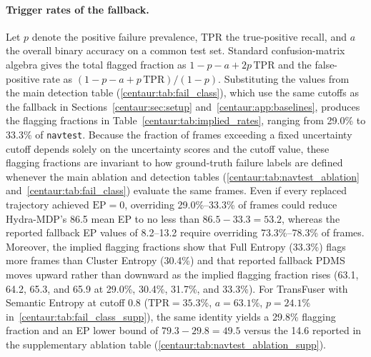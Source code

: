 \paragraph{Trigger rates of the fallback.} Let $p$ denote the positive failure prevalence, $\mathrm{TPR}$ the true-positive recall, and $a$ the overall binary accuracy on a common test set. Standard confusion-matrix algebra gives the total flagged fraction as $1 - p - a + 2p\,\mathrm{TPR}$ and the false-positive rate as $(1 - p - a + p\,\mathrm{TPR})/(1 - p)$. Substituting the values from the main detection table (\ref{centaur:tab:fail_class}), which use the same cutoffs as the fallback in Sections~\ref{centaur:sec:setup} and~\ref{centaur:app:baselines}, produces the flagging fractions in Table~\ref{centaur:tab:implied_rates}, ranging from 29.0\% to 33.3\% of \texttt{navtest}. Because the fraction of frames exceeding a fixed uncertainty cutoff depends solely on the uncertainty scores and the cutoff value, these flagging fractions are invariant to how ground-truth failure labels are defined whenever the main ablation and detection tables (\ref{centaur:tab:navtest_ablation} and~\ref{centaur:tab:fail_class}) evaluate the same frames. Even if every replaced trajectory achieved $\mathrm{EP}=0$, overriding 29.0\%--33.3\% of frames could reduce Hydra-MDP's 86.5 mean EP to no less than $86.5 - 33.3 = 53.2$, whereas the reported fallback EP values of 8.2--13.2 require overriding 73.3\%--78.3\% of frames. Moreover, the implied flagging fractions show that Full Entropy (33.3\%) flags more frames than Cluster Entropy (30.4\%) and that reported fallback PDMS moves upward rather than downward as the implied flagging fraction rises (63.1, 64.2, 65.3, and 65.9 at 29.0\%, 30.4\%, 31.7\%, and 33.3\%). For TransFuser with Semantic Entropy at cutoff 0.8 ($\mathrm{TPR}=35.3$\%, $a=63.1$\%, $p=24.1$\% in~\ref{centaur:tab:fail_class_supp}), the same identity yields a 29.8\% flagging fraction and an EP lower bound of $79.3 - 29.8 = 49.5$ versus the 14.6 reported in the supplementary ablation table (\ref{centaur:tab:navtest_ablation_supp}).

